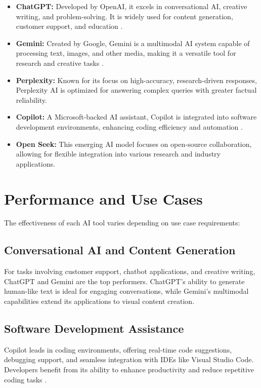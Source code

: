 \documentclass[a4paper,headinclude=on,footinclude=on,12pt,oneside]{scrbook}
\begin{document}
\begin{itemize}
	\item \textbf{ChatGPT:} Developed by OpenAI, it excels in conversational AI, creative writing, and problem-solving. It is widely used for content generation, customer support, and education \cite{ChatGPTCopilotVisual}.
	\item \textbf{Gemini:} Created by Google, Gemini is a multimodal AI system capable of processing text, images, and other media, making it a versatile tool for research and creative tasks \cite{chriscarmichaelLibraryGuidesGuideArtificial}.
	\item \textbf{Perplexity:} Known for its focus on high-accuracy, research-driven responses, Perplexity AI is optimized for answering complex queries with greater factual reliability.
	\item \textbf{Copilot:} A Microsoft-backed AI assistant, Copilot is integrated into software development environments, enhancing coding efficiency and automation \cite{MicrosoftCopilotAI}.
	\item \textbf{Open Seek:} This emerging AI model focuses on open-source collaboration, allowing for flexible integration into various research and industry applications.
\end{itemize}

\section{Performance and Use Cases}

The effectiveness of each AI tool varies depending on use case requirements:

\subsection{Conversational AI and Content Generation}

For tasks involving customer support, chatbot applications, and creative writing, ChatGPT and Gemini are the top performers. ChatGPT's ability to generate human-like text is ideal for engaging conversations, while Gemini's multimodal capabilities extend its applications to visual content creation.

\subsection{Software Development Assistance}

Copilot leads in coding environments, offering real-time code suggestions, debugging support, and seamless integration with IDEs like Visual Studio Code. Developers benefit from its ability to enhance productivity and reduce repetitive coding tasks \cite{ChatGPTCopilotVisual}.
\end{document}
